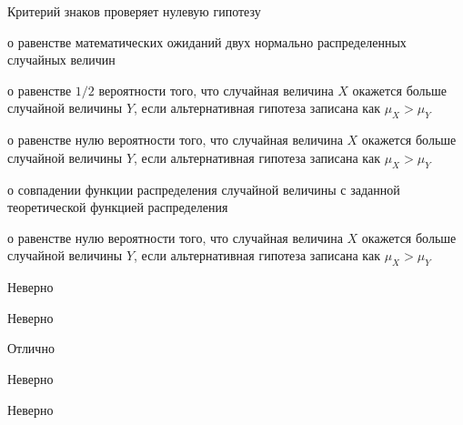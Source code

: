 
\begin{question}
Критерий знаков проверяет нулевую гипотезу
\begin{answerlist}
  \item о равенстве математических ожиданий двух нормально распределенных
случайных величин
  \item о равенстве \(1/2\) вероятности того, что случайная величина \(X\)
окажется больше случайной величины \(Y\), если альтернативная гипотеза
записана как \(\mu_X>\mu_Y\)
  \item о равенстве нулю вероятности того, что случайная величина \(X\) окажется
больше случайной величины \(Y\), если альтернативная гипотеза записана
как \(\mu_X>\mu_Y\)
  \item о совпадении функции распределения случайной величины с заданной
теоретической функцией распределения
  \item о равенстве нулю вероятности того, что случайная величина \(X\) окажется
больше случайной величины \(Y\), если альтернативная гипотеза записана
как \(\mu_X>\mu_Y\)
\end{answerlist}
\end{question}

\begin{solution}
\begin{answerlist}
  \item Неверно
  \item Неверно
  \item Отлично
  \item Неверно
  \item Неверно
\end{answerlist}
\end{solution}

